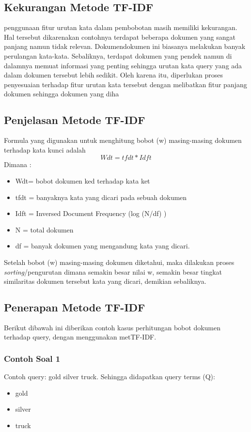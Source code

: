\subsection{Kekurangan Metode TF-IDF}
penggunaan fitur urutan kata dalam pembobotan masih memiliki kekurangan.
Hal tersebut dikarenakan contohnya terdapat beberapa dokumen yang sangat panjang namun tidak relevan. Dokumendokumen ini biasanya melakukan banyak perulangan kata-kata. Sebaliknya, terdapat dokumen yang pendek namun di dalamnya memuat informasi yang penting sehingga urutan kata query yang ada dalam dokumen tersebut lebih sedikit. Oleh karena itu, diperlukan proses penyesuaian terhadap fitur urutan kata tersebut dengan melibatkan fitur panjang dokumen sehingga dokumen yang diha
\subsection{Penjelasan Metode TF-IDF}
Formula yang digunakan untuk menghitung bobot (w) masing-masing dokumen terhadap kata kunci adalah 
\begin{equation}
    Wdt = tfdt *Idft
\end{equation}
Dimana :
\begin{itemize}
    \item Wdt= bobot dokumen ke­d terhadap kata ke­t  
    \item tfdt = banyaknya kata yang dicari pada sebuah 
dokumen  
    \item Idft = Inversed Document Frequency (log 
(N/df) )
    \item N = total dokumen  
    \item df = banyak dokumen yang mengandung kata 
yang dicari.
\end{itemize}

Setelah bobot (w) masing-masing dokumen diketahui, maka dilakukan proses \textit{sorting}/pengurutan dimana semakin besar nilai w, semakin besar tingkat similaritas dokumen tersebut kata yang dicari, demikian sebaliknya.

\subsection{Penerapan Metode TF-IDF}
Berikut dibawah ini diberikan contoh kasus perhitungan bobot dokumen terhadap query, dengan menggunakan metTF-IDF.
\subsubsection{Contoh Soal 1}
\par Contoh query: gold silver truck. Sehingga didapatkan query terms (Q):
\begin{itemize}
    \item gold
    \item silver
    \item truck
\end{itemize}

